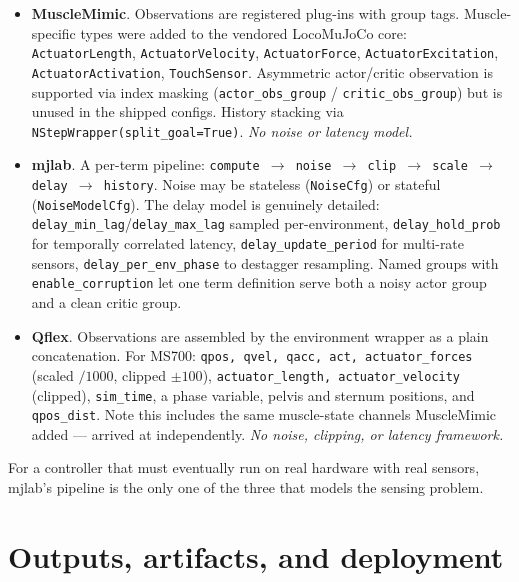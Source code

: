 \documentclass[11pt,a4paper]{article}
\newcommand{\MM}{\textcolor{mmC}{\textbf{MuscleMimic}}}
\newcommand{\MJ}{\textcolor{mjC}{\textbf{mjlab}}}
\newcommand{\QF}{\textcolor{qfC}{\textbf{Qflex}}}
\begin{document}
\begin{itemize}[leftmargin=1.4em,itemsep=0.3em]
\item \MM. Observations are registered plug-ins with group tags. Muscle-specific types
were added to the vendored LocoMuJoCo core: \texttt{ActuatorLength},
\texttt{ActuatorVelocity}, \texttt{ActuatorForce}, \texttt{ActuatorExcitation},
\texttt{ActuatorActivation}, \texttt{TouchSensor}. Asymmetric actor/critic observation is
supported via index masking (\texttt{actor\_obs\_group} / \texttt{critic\_obs\_group}) but
is unused in the shipped configs. History stacking via
\texttt{NStepWrapper(split\_goal=True)}. \emph{No noise or latency model.}

\item \MJ. A per-term pipeline:
\texttt{compute $\rightarrow$ noise $\rightarrow$ clip $\rightarrow$ scale $\rightarrow$ delay $\rightarrow$ history}.
Noise may be stateless (\texttt{NoiseCfg}) or stateful (\texttt{NoiseModelCfg}). The delay
model is genuinely detailed: \texttt{delay\_min\_lag}/\texttt{delay\_max\_lag} sampled
per-environment, \texttt{delay\_hold\_prob} for temporally correlated latency,
\texttt{delay\_update\_period} for multi-rate sensors, \texttt{delay\_per\_env\_phase} to
destagger resampling. Named groups with \texttt{enable\_corruption} let one term
definition serve both a noisy actor group and a clean critic group.

\item \QF. Observations are assembled by the environment wrapper as a plain concatenation.
For MS700: \texttt{qpos, qvel, qacc, act, actuator\_forces} (scaled $/1000$, clipped
$\pm100$), \texttt{actuator\_length, actuator\_velocity} (clipped), \texttt{sim\_time},
a phase variable, pelvis and sternum positions, and \texttt{qpos\_dist}. Note this
includes the same muscle-state channels MuscleMimic added --- arrived at independently.
\emph{No noise, clipping, or latency framework.}
\end{itemize}

\noindent
For a controller that must eventually run on real hardware with real sensors, mjlab's
pipeline is the only one of the three that models the sensing problem.

\section{Outputs, artifacts, and deployment}
\label{sec:outputs}
\end{document}
